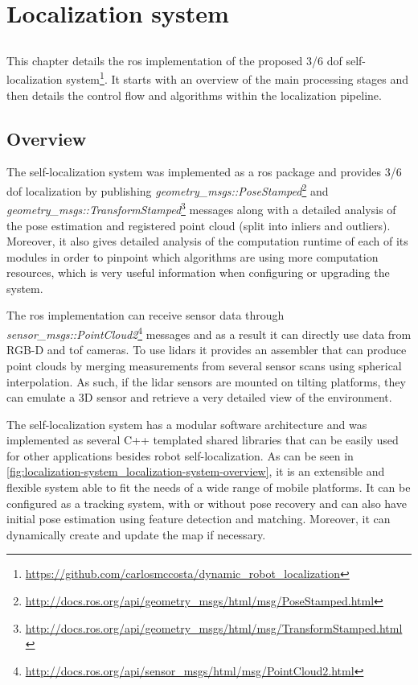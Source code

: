 \chapter{Localization system} \label{chap:localization-system}



\section*{}

This chapter details the \gls{ros} implementation of the proposed 3/6 \gls{dof} self-localization system\footnote{\url{https://github.com/carlosmccosta/dynamic_robot_localization}}. It starts with an overview of the main processing stages and then details the control flow and algorithms within the localization pipeline.



\section{Overview}

The self-localization system was implemented as a \gls{ros} package and provides 3/6 \gls{dof} localization by publishing \emph{geometry\_msgs::PoseStamped}\footnote{\url{http://docs.ros.org/api/geometry_msgs/html/msg/PoseStamped.html}} and \emph{geometry\_msgs::TransformStamped}\footnote{\url{http://docs.ros.org/api/geometry_msgs/html/msg/TransformStamped.html}} messages along with a detailed analysis of the pose estimation and registered point cloud (split into inliers and outliers). Moreover, it also gives detailed analysis of the computation runtime of each of its modules in order to pinpoint which algorithms are using more computation resources, which is very useful information when configuring or upgrading the system.

The \gls{ros} implementation can receive sensor data through \emph{sensor\_msgs::PointCloud2}\footnote{\url{http://docs.ros.org/api/sensor_msgs/html/msg/PointCloud2.html}} messages and as a result it can directly use data from RGB-D and \gls{tof} cameras. To use \glspl{lidar} it provides an assembler that can produce point clouds by merging measurements from several sensor scans using spherical interpolation. As such, if the \gls{lidar} sensors are mounted on tilting platforms, they can emulate a 3D sensor and retrieve a very detailed view of the environment.

The self-localization system has a modular software architecture and was implemented as several C++ templated shared libraries that can be easily used for other applications besides robot self-localization. As can be seen in \cref{fig:localization-system_localization-system-overview}, it is an extensible and flexible system able to fit the needs of a wide range of mobile platforms. It can be configured as a tracking system, with or without pose recovery and can also have initial pose estimation using feature detection and matching. Moreover, it can dynamically create and update the map if necessary.

